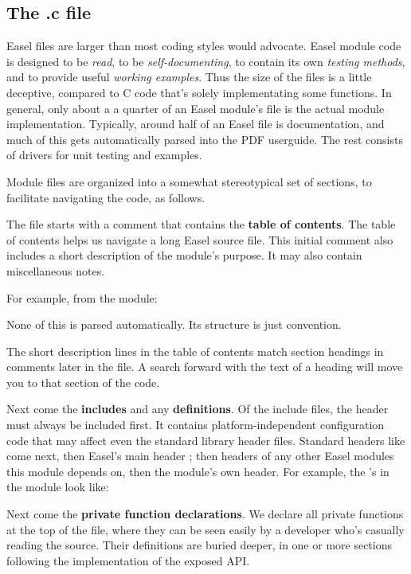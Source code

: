 \subsection{The .c file}

Easel  files are larger than most coding styles would
advocate. Easel module code is designed to be \emph{read}, to be
\emph{self-documenting}, to contain its own \emph{testing methods},
and to provide useful \emph{working examples}.  Thus the size of the
files is a little deceptive, compared to C code that's solely
implementating some functions. In general, only about a a quarter of
an Easel module's  file is the actual module implementation.
Typically, around half of an Easel  file is documentation,
and much of this gets automatically parsed into the PDF userguide. The
rest consists of drivers for unit testing and examples.

Module files are organized into a somewhat stereotypical set of
sections, to facilitate navigating the code, as follows.

The  file starts with a comment that contains the {\bfseries
  table of contents}. The table of contents helps us navigate a long
Easel source file. This initial comment also includes a short
description of the module's purpose. It may also contain miscellaneous
notes.

For example, from the  module:



None of this is parsed automatically. Its structure is just
convention.

The short description lines in the table of contents match section
headings in comments later in the file. A search forward with the text
of a heading will move you to that section of the code.

Next come the {\bfseries includes} and any {\bf definitions}. Of the
include files, the  header must always be
included first. It contains platform-independent configuration code
that may affect even the standard library header files. Standard
headers like  come next, then Easel's main header
; then headers of any other Easel modules this module
depends on, then the module's own header. For example, the
's in the  module look like:



Next come the {\bfseries private function declarations}.  We declare
all private functions at the top of the file, where they can be seen
easily by a developer who's casually reading the source. Their
definitions are buried deeper, in one or more sections following the
implementation of the exposed API.

